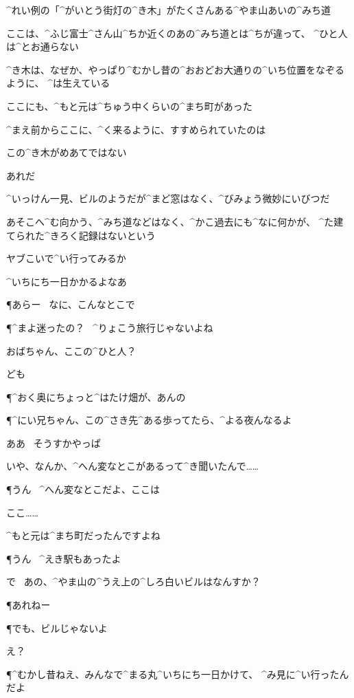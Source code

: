 \page
\Y ^{れい}{例}の「^{がいとう}{街灯}の^{き}{木}」がたくさんある^{やま}{山}あいの^{みち}{道}

\Y ここは、^{ふじ}{富士}^{さん}{山}^{ちか}{近}くのあの^{みち}{道}とは^{ちが}{違}って、
^{ひと}{人}は^{とお}{通}らない

\page
\Y ^{き}{木}は、なぜか、やっぱり^{むかし}{昔}の^{おおどお}{大通}りの^{いち}{位置}をなぞるように、
^{は}{生}えている

\Y ここにも、^{もと}{元}は^{ちゅう}{中}くらいの^{まち}{町}があった

\Y ^{まえ}{前}からここに、^{く}{来}るように、すすめられていたのは

\Y この^{き}{木}がめあてではない

\Y あれだ

\page
\Y ^{いっけん}{一見}、ビルのようだが^{まど}{窓}はなく、^{びみょう}{微妙}にいびつだ

\Y あそこへ^{む}{向}かう、^{みち}{道}などはなく、^{かこ}{過去}にも^{なに}{何}かが、
^{た}{建}てられた^{きろく}{記録}はないという

\Y ヤブこいで^{い}{行}ってみるか

\Y ^{いちにち}{一日}かかるよなあ

\page
\P あらー
\ なに、こんなとこで

\P ^{まよ}{迷}ったの？
\ ^{りょこう}{旅行}じゃないよね

\Y おばちゃん、ここの^{ひと}{人}？

\Y ども

\P ^{おく}{奥}にちょっと^{はたけ}{畑}が、あんの

\P ^{にい}{兄}ちゃん、この^{さき}{先}^{ある}{歩}ってたら、^{よる}{夜}んなるよ

\Y ああ
\ そうすかやっぱ

\Y いや、なんか、^{へん}{変}なとこがあるって^{き}{聞}いたんで……

\P うん
\ ^{へん}{変}なとこだよ、ここは

\Y ここ……

\Y ^{もと}{元}は^{まち}{町}だったんですよね

\P うん
\ ^{えき}{駅}もあったよ

\page
\Y で
\ あの、^{やま}{山}の^{うえ}{上}の^{しろ}{白}いビルはなんすか？

\P あれねー

\P でも、ビルじゃないよ

\Y え？

\P ^{むかし}{昔}ねえ、みんなで^{まる}{丸}^{いちにち}{一日}かけて、
^{み}{見}に^{い}{行}ったんだよ

